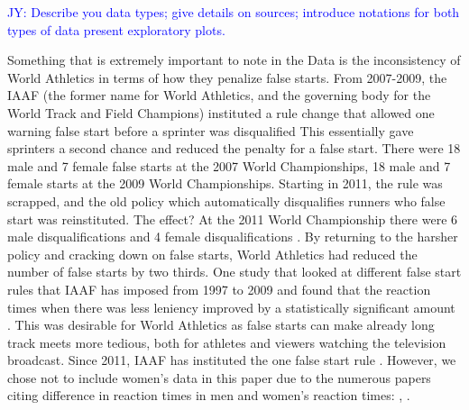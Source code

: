 \documentclass[12pt, letterpaper, titlepage]{article}
\newcommand{\jy}[1]{\textcolor{blue}{JY: #1}}
\begin{document}
\jy{Describe you data types; give details on sources; introduce notations for
  both types of data
  present exploratory plots.}

Something that is extremely important to note in the Data is the inconsistency 
of World Athletics in terms of how they penalize false starts.  From 2007-2009,
the IAAF (the former name for World Athletics, and the governing body for the 
World Track and Field Champions) instituted a rule change that allowed one 
warning false start before a sprinter was disqualified \citep{False-Start}  This 
essentially gave sprinters a second chance and reduced the penalty for a false 
start.  There were 18 male and 7 female false starts at the 2007 World 
Championships, 18 male and 7 female starts at the 2009 World Championships. 
Starting in 2011, the rule was scrapped, and the old policy which automatically 
disqualifies runners who false start was reinstituted.  The effect? At the 2011 
World Championship there were 6 male disqualifications and 4 female 
disqualifications \citep{False-Start}. By returning to the harsher policy and 
cracking down on false starts, World Athletics had reduced the number of 
false starts by two thirds. One study that looked at different false start
rules that IAAF has imposed from 1997 to 2009 and found that the reaction 
times when there was less leniency improved by a statistically significant amount
\citep{haugen2013effect}. This was desirable for World Athletics as false starts can 
make already long track meets more tedious, both for athletes and viewers watching the 
television broadcast.  Since 2011, IAAF has instituted the one false start rule
\citep{Pilianidis}.  However, we chose not to include women's data in this
paper due to the numerous papers citing difference in reaction times in men and
women's reaction times: \citet{lipps2011implications}, \citet{babicc2009reaction}
\citet{panoutsakopoulos2020gender}.
\end{document}
